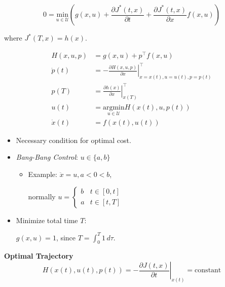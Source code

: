 \documentclass[landscape,a0paper,fontscale=0.285]{baposter} %
\begin{document}
\begin{poster}
{$$
0 = \underset{u \in \mathcal{U}}{\text{min}} \left(g(x,u) + \frac{\partial J^*(t,x)}{\partial t} + \frac{\partial J^*(t,x)}{\partial x} f(x,u)\right)
$$

where \( J^*(T,x) = h(x) \).

\colorbox[HTML]{CCFFFF}{}

$$
\begin{aligned}
H(x, u, p) &= g(x, u) + p^\top f(x,u) \\
\dot{p}(t) &= -\left.\frac{\partial H(x, u, p)}{\partial x}\right|_{x = x(t), u = u(t), p = p(t)}^\top\\
p(T) &= \left.\frac{\partial h(x)}{\partial x}\right|^\top_{x(T)} \\
u(t) &= \underset{u \in \mathcal{U}}{\text{argmin}} H(x(t), u, p(t)) \\
\dot{x}(t) &= f(x(t), u(t))
\end{aligned}
$$

\begin{itemize}
  \item Necessary condition for optimal cost.
  \item \textit{Bang-Bang Control}: \( u \in \{a, b\} \)
    \begin{itemize}[label=$\circ$]
      \item Example: \( \ddot{x} = u, a < 0 < b \), 
      
      normally \( u = \begin{cases}b & t \in [0, t] \\ a & t \in [t, T]\end{cases} \)
    \end{itemize}
  \item Minimize total time \( T \): 
  
  \( g(x, u) = 1 \), since \( T = \int_0^T 1 \, d\tau \).
\end{itemize}




\textbf {Optimal Trajectory}
\[
H(x(t), u(t), p(t)) = -\left.\frac{\partial J(t, x)}{\partial t}\right|_{x(t)} = \text{constant}
\]



}

\end{poster}
\end{document}
